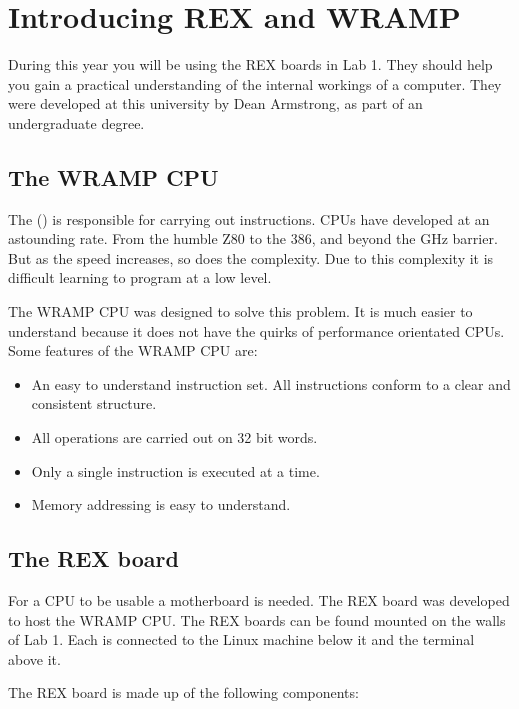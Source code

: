 \section{Introducing REX and WRAMP}

During this year you will be using the REX boards in Lab 1.  
They should help you gain a practical understanding of the internal workings
of a computer.  They were developed at this university by Dean Armstrong, as
part of an undergraduate degree.  


\subsection{The WRAMP CPU}
The  () is responsible for carrying out 
instructions.
CPUs have developed at an astounding rate.  From the humble Z80 to the 386, and
beyond the GHz barrier.  But as the speed increases, so does
the complexity.  Due to this complexity it is difficult learning to program
at a low level. 

The WRAMP CPU was designed to solve this problem. It is much easier to 
understand because it does not have the quirks of performance orientated CPUs.
Some features of the WRAMP CPU are:
\begin{itemize}
\item An easy to understand instruction set.  All instructions conform
to a clear and consistent structure.
\item All operations are carried out on 32 bit words.
\item Only a single instruction is executed at a time.
\item Memory addressing is easy to understand.
\end{itemize}

\subsection{The REX board}
For a CPU to be usable a motherboard is needed.  The REX board was developed
to host the WRAMP CPU. The REX boards can be found mounted on the walls of 
Lab 1.  Each is connected to the Linux machine below it and the terminal 
above it.

The REX board is made up of the following components:

